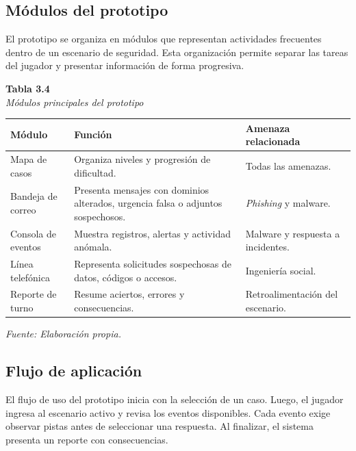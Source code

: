 \subsection{M\'{o}dulos del prototipo}

El prototipo se organiza en m\'{o}dulos que representan actividades frecuentes dentro de un escenario de seguridad. Esta organizaci\'{o}n permite separar las tareas del jugador y presentar informaci\'{o}n de forma progresiva.

\begin{center}
\textbf{Tabla 3.4}\\
\textit{M\'{o}dulos principales del prototipo}

\vspace{0.2cm}
\begin{tabular}{|p{}|p{}|p{}|}
\hline
\textbf{M\'{o}dulo} & \textbf{Funci\'{o}n} & \textbf{Amenaza relacionada} \\
\hline
Mapa de casos & Organiza niveles y progresi\'{o}n de dificultad. & Todas las amenazas. \\
\hline
Bandeja de correo & Presenta mensajes con dominios alterados, urgencia falsa o adjuntos sospechosos. & \textit{Phishing} y malware. \\
\hline
Consola de eventos & Muestra registros, alertas y actividad an\'{o}mala. & Malware y respuesta a incidentes. \\
\hline
L\'{i}nea telef\'{o}nica & Representa solicitudes sospechosas de datos, c\'{o}digos o accesos. & Ingenier\'{i}a social. \\
\hline
Reporte de turno & Resume aciertos, errores y consecuencias. & Retroalimentaci\'{o}n del escenario. \\
\hline
\end{tabular}

\textit{Fuente: Elaboraci\'{o}n propia.}
\end{center}

\subsection{Flujo de aplicaci\'{o}n}

El flujo de uso del prototipo inicia con la selecci\'{o}n de un caso. Luego, el jugador ingresa al escenario activo y revisa los eventos disponibles. Cada evento exige observar pistas antes de seleccionar una respuesta. Al finalizar, el sistema presenta un reporte con consecuencias.

